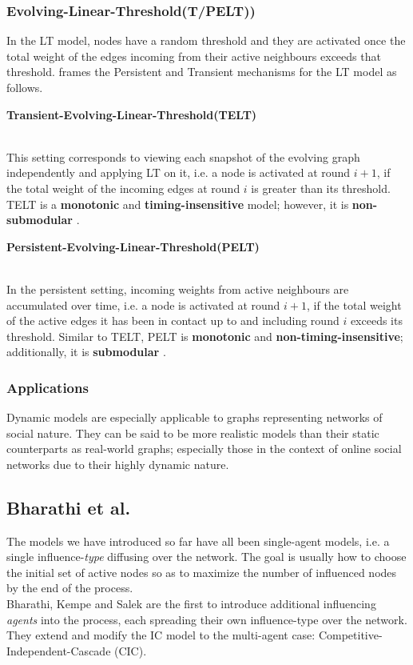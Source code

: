 \documentclass[twocolumn, 10pt]{article}
\begin{document}
\subsubsection{Evolving-Linear-Threshold(T/PELT))}
In the LT model, nodes have a random threshold and they are activated once the total weight of the edges incoming from their active neighbours exceeds that threshold. \cite{gay} frames the Persistent and Transient mechanisms for the LT model as follows.\\
\begin{minipage}{\textwidth}\textbf{Transient-Evolving-Linear-Threshold(TELT)}\end{minipage}\\
This setting corresponds to viewing each snapshot of the evolving graph independently and applying LT on it, i.e. a node is activated at round $i+1$, if the total weight of the incoming edges at round $i$ is greater than its threshold. TELT is a \textbf{monotonic} and \textbf{timing-insensitive} model; however, it is \textbf{non-submodular} \cite{gay}. \\
\begin{minipage}{\textwidth}\textbf{Persistent-Evolving-Linear-Threshold(PELT)} \end{minipage}\\
In the persistent setting, incoming weights from active neighbours are accumulated over time, i.e. a node is activated at round $i+1$, if the total weight of the active edges it has been in contact up to and including round $i$ exceeds its threshold. Similar to TELT, PELT is \textbf{monotonic} and \textbf{non-timing-insensitive}; additionally, it is \textbf{submodular} \cite{gay}.
\subsubsection{Applications}
Dynamic models are especially applicable to graphs representing networks of social nature. They can be said to be more realistic models than their static counterparts as real-world graphs; especially those in the context of online social networks due to their highly dynamic nature.
\subsection{Bharathi et al. \cite{bhar}}
The models we have introduced so far have all been single-agent models, i.e. a single influence-\textit{type} diffusing over the network. The goal is usually how to choose the initial set of active nodes so as to maximize the number of influenced nodes by the end of the process. \\
Bharathi, Kempe and Salek are the first to introduce additional influencing \textit{agents} into the process, each spreading their own influence-type over the network. They extend and modify the IC model to the multi-agent case: Competitive-Independent-Cascade (CIC).
\end{document}
